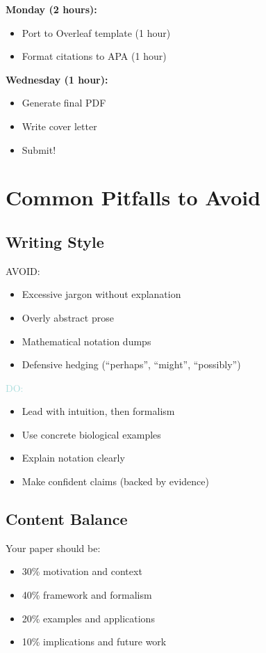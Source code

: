 \documentclass[11pt]{article}
\begin{document}
\textbf{Monday (2 hours):}
\begin{itemize}[label=$\square$]
    \item Port to Overleaf template (1 hour)
    \item Format citations to APA (1 hour)
\end{itemize}

\textbf{Wednesday (1 hour):}
\begin{itemize}[label=$\square$]
    \item Generate final PDF
    \item Write cover letter
    \item Submit!
\end{itemize}

\section{Common Pitfalls to Avoid}

\subsection{Writing Style}

\textcolor{edit}{AVOID:}
\begin{itemize}
    \item Excessive jargon without explanation
    \item Overly abstract prose
    \item Mathematical notation dumps
    \item Defensive hedging (``perhaps'', ``might'', ``possibly'')
\end{itemize}

\textcolor{add}{DO:}
\begin{itemize}
    \item Lead with intuition, then formalism
    \item Use concrete biological examples
    \item Explain notation clearly
    \item Make confident claims (backed by evidence)
\end{itemize}

\subsection{Content Balance}

Your paper should be:
\begin{itemize}
    \item 30\% motivation and context
    \item 40\% framework and formalism
    \item 20\% examples and applications
    \item 10\% implications and future work
\end{itemize}
\end{document}
